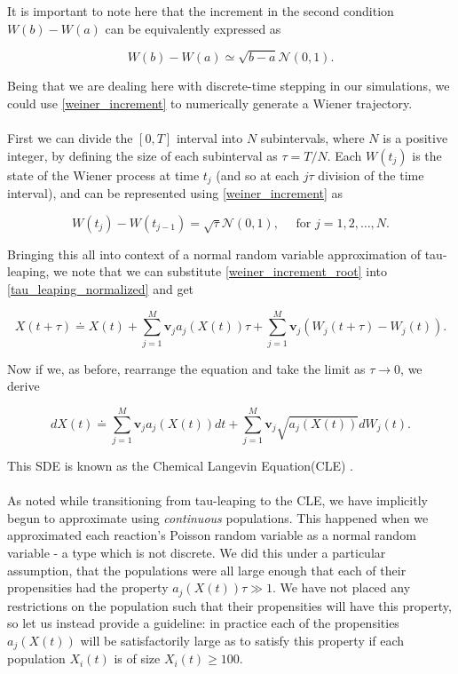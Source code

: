 \documentclass[ugrad,lot,lof,openright,11pt,oneside,onehalfspace]{RUthesis}
\begin{document}
				\noindent
				It is important to note here that the increment in the second condition $W(b)-W(a)$ can be equivalently expressed as

				\begin{equation}\label{weiner_increment}
				W(b)-W(a) \simeq \sqrt{b-a}\mathcal{N}(0,1).
				\end{equation}

				\noindent
				Being that we are dealing here with discrete-time stepping in our simulations, we could use \eqref{weiner_increment} to numerically generate a Wiener trajectory.\\
				\\
				First we can divide the $[0,T]$ interval into $N$ subintervals, where $N$ is a positive integer, by defining the size of each subinterval as $\tau = T/N$. Each $W(t_j)$ is the state of the Wiener process at time $t_j$ (and so at each $j\tau$ division of the time interval), and can be represented using \eqref{weiner_increment} as

				\begin{equation}\label{weiner_increment_root}
				W(t_j) - W(t_{j-1}) = \sqrt{\tau}\mathcal{N}(0,1), \quad\text{ for } j = 1,2,\ldots,N.
				\end{equation}

				\noindent
				Bringing this all into context of a normal random variable approximation of tau-leaping, we note that we can substitute \eqref{weiner_increment_root} into \eqref{tau_leaping_normalized} and get

				\begin{equation}\label{cle_antiderivative}
				X(t+\tau) \doteq X(t) + \sum\limits_{j=1}^{M} \mathbf{v}_j a_j(X(t))\tau + \sum\limits_{j=1}^{M} \mathbf{v}_j (W_j(t+\tau)-W_j(t)).
				\end{equation}

				\noindent
				Now if we, as before, rearrange the equation and take the limit as $\tau \rightarrow 0$, we derive

				\begin{equation}\label{cle}
				dX(t) \doteq \sum\limits_{j=1}^{M} \mathbf{v}_j a_j(X(t))dt + \sum\limits_{j=1}^{M} \mathbf{v}_j \sqrt{a_j(X(t))} dW_j(t).
				\end{equation}

				\noindent
				This SDE is known as the Chemical Langevin Equation(CLE) \cite{sim_chem_reactions}.\\
				\\
				As noted  while transitioning from tau-leaping to the CLE, we have implicitly begun to approximate using \textit{continuous} populations. This happened when we approximated each reaction's Poisson random variable as a normal random variable - a type which is not discrete. We did this under a particular assumption, that the populations were all large enough that each of their propensities had the property $a_j(X(t))\tau \gg 1$. We have not placed any restrictions on the population such that their propensities will have this property, so let us instead provide a guideline: in practice each of the propensities $a_j(X(t))$ will be satisfactorily large as to satisfy this property if each population $X_i(t)$ is of size $X_i(t) \geq 100$.
\end{document}

